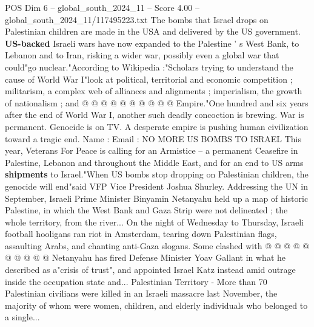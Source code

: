 \begin{textsample}{POS Dim 6 – global\_south\_2024\_11 – Score 4.00 – global\_south\_2024\_11/117495223.txt}
The bombs that Israel drops on Palestinian children are made in the USA and delivered by the US government. \textbf{US-backed} Israeli wars have now expanded to the Palestine ' s West Bank, to Lebanon and to Iran, risking a wider war, possibly even a global war that could"go nuclear."According to Wikipedia :"Scholars trying to understand the cause of World War I"look at political, territorial and economic competition ; militarism, a complex web of alliances and alignments ; imperialism, the growth of nationalism ; and @ @ @ @ @ @ @ @ @ @ Empire."One hundred and six years after the end of World War I, another such deadly concoction is brewing.
War is permanent.
Genocide is on TV.
A desperate empire is pushing human civilization toward a tragic end.
Name : Email : NO MORE US BOMBS TO ISRAEL This year, Veterans For Peace is calling for an Armistice -- a permanent Ceasefire in Palestine, Lebanon and throughout the Middle East, and for an end to US arms \textbf{shipments} to Israel."When US bombs stop dropping on Palestinian children, the genocide will end"said VFP Vice President Joshua Shurley.
Addressing the UN in September, Israeli Prime Minister Binyamin Netanyahu held up a map of historic Palestine, in which the West Bank and Gaza Strip were not delineated ; the whole territory, from the river...
On the night of Wednesday to Thursday, Israeli football hooligans ran riot in Amsterdam, tearing down Palestinian flags, assaulting Arabs, and chanting anti-Gaza slogans.
Some clashed with @ @ @ @ @ @ @ @ @ @ Netanyahu has fired Defense Minister Yoav Gallant in what he described as a"crisis of trust", and appointed Israel Katz instead amid outrage inside the occupation state and...
Palestinian Territory - More than 70 Palestinian civilians were killed in an Israeli massacre last November, the majority of whom were women, children, and elderly individuals who belonged to a single...

\end{textsample}
